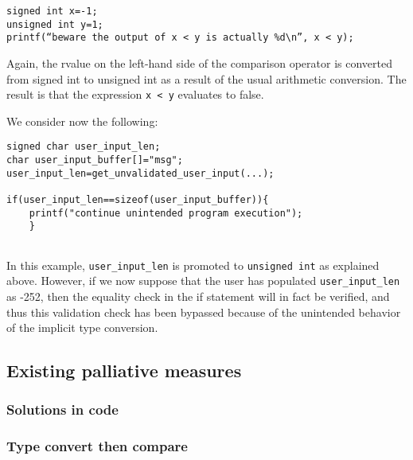 \documentclass[11pt,letterpaper]{article}
\begin{document}
\begin{lstlisting}[style=CStyle]
signed int x=-1;
unsigned int y=1;
printf(“beware the output of x < y is actually %d\n”, x < y);
\end{lstlisting}

Again, the rvalue on the left-hand side of the comparison operator is converted from signed int to unsigned int as a result of the usual arithmetic conversion.
The result is that the expression \texttt{x < y} evaluates to false.

We consider now the following:

\begin{lstlisting}[style=CStyle]
signed char user_input_len;
char user_input_buffer[]="msg";
user_input_len=get_unvalidated_user_input(...);

if(user_input_len==sizeof(user_input_buffer)){
	printf("continue unintended program execution");
	}	
 	
\end{lstlisting}

In this example,  \texttt{user\_input\_len} is promoted to \texttt{unsigned int} as explained above. However, if we now suppose that the user has populated \texttt{user\_input\_len} as -252, then the equality check in the if statement will in fact be verified, and thus this validation check has been bypassed because of the unintended behavior of the implicit type conversion. 


\subsection{Existing palliative measures}


\subsubsection{Solutions in code}
\subsubsection{Type convert then compare}
\end{document}
